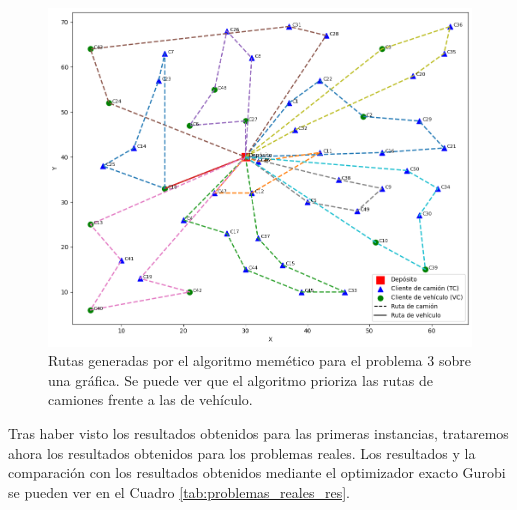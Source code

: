 \begin{figure}[!t]
    \centering
    \includegraphics[width=.58\linewidth]{figures/P3.png}
    \caption{Rutas generadas por el algoritmo memético para el problema 3 sobre una gráfica. Se puede ver que el algoritmo prioriza las rutas de camiones frente a las de vehículo.}
    \label{fig:graficas_benchmarks}
\end{figure}
Tras haber visto los resultados obtenidos para las primeras instancias, trataremos ahora los resultados obtenidos para los problemas reales. Los resultados y la comparación con los resultados obtenidos mediante el optimizador exacto Gurobi se pueden ver en el Cuadro \ref{tab:problemas_reales_res}.
